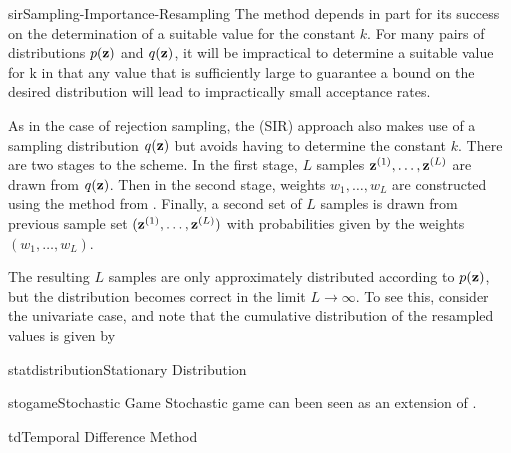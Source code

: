 \documentclass[9pt]{article}
\begin{document}
\begin{topic}{sir}{Sampling-Importance-Resampling}
The  method depends in part for its success on the determination of a suitable value for the constant $k$. For many pairs of distributions $p(\mathbf{z})$ and $q(\mathbf{z})$, it will be impractical to determine a suitable value for k in that any value that is sufficiently large to guarantee a bound on the desired distribution will lead to impractically small acceptance rates.

As in the case of rejection sampling, the  (SIR) approach also makes use of a sampling distribution $q(\mathbf{z})$ but avoids having to determine the constant $k$. There are two stages to the scheme. In the first stage, $L$ samples $\mathbf{z}^{(1)}, \ldots , \mathbf{z}^{(L)}$ are drawn from $q(\mathbf{z})$. Then in the second stage, weights $w_1, \ldots, w_L$ are constructed using the method from . Finally, a second set of $L$ samples is drawn from previous sample set $(\mathbf{z}^{(1)} , \ldots , \mathbf{z}^{(L)} )$ with probabilities given by the weights $(w_1, \ldots , w_L)$.

The resulting $L$ samples are only approximately distributed according to $p(\mathbf{z})$, but the distribution becomes correct in the limit $L \to \infty$. To see this, consider the univariate case, and note that the cumulative distribution of the resampled values is given by

\Working
\end{topic}

\begin{topic}{statdistribution}{Stationary Distribution}
\Working
\end{topic}

\begin{topic}{stogame}{Stochastic Game}
Stochastic game can been seen as an extension of .
\end{topic}

\begin{topic}{td}{Temporal Difference Method} 
\end{topic}
\end{document}
